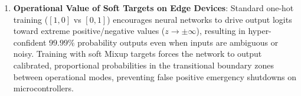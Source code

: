 \begin{enumerate}
\begin{enumerate}[label=(\alph*)]
        \item \textbf{Operational Value of Soft Targets on Edge Devices}:
        Standard one-hot training ($[1, 0]$ vs $[0, 1]$) encourages neural networks to drive output logits toward extreme positive/negative values ($z \to \pm\infty$), resulting in hyper-confident $99.99\%$ probability outputs even when inputs are ambiguous or noisy. Training with soft Mixup targets forces the network to output calibrated, proportional probabilities in the transitional boundary zones between operational modes, preventing false positive emergency shutdowns on microcontrollers.
    \end{enumerate}
\end{enumerate}
